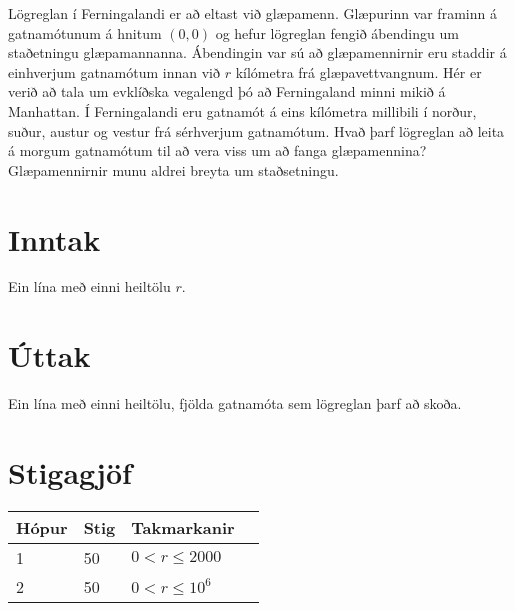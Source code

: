 Lögreglan í Ferningalandi er að eltast við glæpamenn. Glæpurinn var framinn á gatnamótunum á hnitum $(0,0)$ og hefur lögreglan fengið ábendingu um staðetningu glæpamannanna. Ábendingin var sú að glæpamennirnir eru staddir á einhverjum gatnamótum innan við $r$ kílómetra frá glæpavettvangnum. Hér er verið að tala um evklíðska vegalengd þó að Ferningaland minni mikið á Manhattan. Í Ferningalandi eru gatnamót á eins kílómetra millibili í norður, suður, austur og vestur frá sérhverjum gatnamótum. Hvað þarf lögreglan að leita á morgum gatnamótum til að vera viss um að fanga glæpamennina? Glæpamennirnir munu aldrei breyta um staðsetningu.

\section*{Inntak}
Ein lína með einni heiltölu $r$.

\section*{Úttak}
Ein lína með einni heiltölu, fjölda gatnamóta sem lögreglan þarf að skoða.

\section*{Stigagjöf}
\begin{tabular}{|l|l|l|l|}
\hline
Hópur & Stig & Takmarkanir \\ \hline
1     & 50   & $0 < r \leq 2000$ \\ \hline
2     & 50   & $0 < r \leq 10^6$ \\ \hline
\end{tabular}
